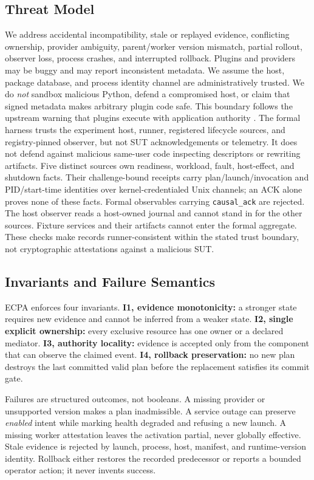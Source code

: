 \documentclass[letterpaper,twocolumn,10pt]{article}
\newcommand{\system}{\textsc{ECPA}\xspace}
\newcommand{\code}[1]{\texttt{#1}}
\begin{document}
\subsection{Threat Model}
We address accidental incompatibility, stale or replayed evidence, conflicting
ownership, provider ambiguity, parent/worker version mismatch, partial rollout,
observer loss, process crashes, and interrupted rollback.  Plugins and
providers may be buggy and may report inconsistent metadata.  We assume the
host, package database, and process identity channel are administratively
trusted.  We do \emph{not} sandbox malicious Python, defend a compromised host,
or claim that signed metadata makes arbitrary plugin code safe.  This boundary
follows the upstream warning that plugins execute with application authority
\cite{vllm-security}.
The formal harness trusts the experiment host, runner, registered lifecycle
sources, and registry-pinned observer, but not SUT acknowledgements or
telemetry. It does not defend against malicious same-user code inspecting
descriptors or rewriting artifacts. Five distinct sources own readiness,
workload, fault, host-effect, and shutdown facts. Their challenge-bound receipts
carry plan/launch/invocation and PID/start-time identities over
kernel-credentialed Unix channels; an ACK alone proves none of these facts.
Formal observables carrying \code{causal\_ack} are rejected.
The host observer reads a host-owned journal and cannot stand in for the other
sources. Fixture services and their artifacts cannot enter the formal
aggregate. These checks make records runner-consistent within the stated trust
boundary, not cryptographic attestations against a malicious SUT.

\subsection{Invariants and Failure Semantics}
\system enforces four invariants.  \textbf{I1, evidence monotonicity:} a stronger
state requires new evidence and cannot be inferred from a weaker state.
\textbf{I2, single explicit ownership:} every exclusive resource has one owner
or a declared mediator.  \textbf{I3, authority locality:} evidence is accepted
only from the component that can observe the claimed event.  \textbf{I4,
rollback preservation:} no new plan destroys the last committed valid plan
before the replacement satisfies its commit gate.

Failures are structured outcomes, not booleans.  A missing provider or
unsupported version makes a plan inadmissible.  A service outage can preserve
\emph{enabled} intent while marking health degraded and refusing a new launch.
A missing worker attestation leaves the activation partial, never globally
effective.  Stale evidence is rejected by launch, process, host, manifest, and
runtime-version identity.  Rollback either restores the recorded predecessor
or reports a bounded operator action; it never invents success.
\end{document}
